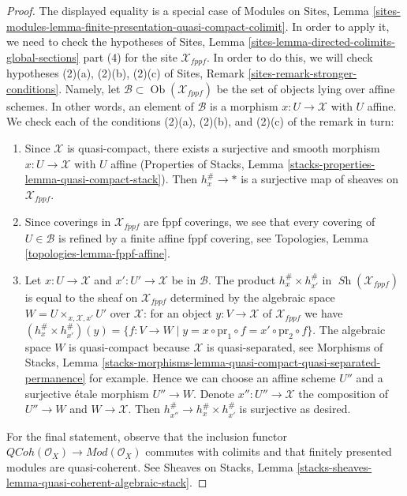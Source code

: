 \documentclass[10pt,a4paper]{amsart}
\theoremstyle{plain}
\theoremstyle{definition}
\theoremstyle{remark}
\numberwithin{equation}{subsection}
\def\Ob{\mathop{\mathrm{Ob}}\nolimits}
\def\Sh{\mathop{\mathit{Sh}}\nolimits}
\def\QCoh{\mathit{QCoh}}
\begin{document}
\begin{proof}
The displayed equality is a special case of Modules on Sites, Lemma
\ref{sites-modules-lemma-finite-presentation-quasi-compact-colimit}.
In order to apply it, we need to check the hypotheses of
Sites, Lemma \ref{sites-lemma-directed-colimits-global-sections} part (4)
for the site $\mathcal{X}_{fppf}$. In order to do this, we will check
hypotheses (2)(a), (2)(b), (2)(c) of
Sites, Remark \ref{sites-remark-stronger-conditions}.
Namely, let $\mathcal{B} \subset \Ob(\mathcal{X}_{fppf})$ be the set
of objects lying over affine schemes. In other words, an element
of $\mathcal{B}$ is a morphism $x : U \to \mathcal{X}$ with $U$ affine.
We check each of the conditions (2)(a), (2)(b), and (2)(c)
of the remark in turn:
\begin{enumerate}
\item Since $\mathcal{X}$ is quasi-compact, there exists a
surjective and smooth morphism $x : U \to \mathcal{X}$ with $U$ affine
(Properties of Stacks, Lemma
\ref{stacks-properties-lemma-quasi-compact-stack}).
Then $h_x^\# \to *$ is a surjective map of sheaves on $\mathcal{X}_{fppf}$.
\item Since coverings in $\mathcal{X}_{fppf}$ are fppf
coverings, we see that every covering of $U \in \mathcal{B}$ is refined
by a finite affine fppf covering, see
Topologies, Lemma \ref{topologies-lemma-fppf-affine}.
\item Let $x : U \to \mathcal{X}$ and $x' : U' \to \mathcal{X}$ be
in $\mathcal{B}$. The product $h_x^\# \times h_{x'}^\#$ in
$\Sh(\mathcal{X}_{fppf})$ is equal to the sheaf on $\mathcal{X}_{fppf}$
determined by the algebraic space $W = U \times_{x, \mathcal{X}, x'} U'$ over
$\mathcal{X}$: for an object $y : V \to \mathcal{X}$ of
$\mathcal{X}_{fppf}$ we have
$(h_x^\# \times h_{x'}^\#)(y) = \{f : V \to W \mid y =
x \circ \text{pr}_1 \circ f = x' \circ \text{pr}_2 \circ f\}$.
The algebraic space $W$ is quasi-compact because $\mathcal{X}$
is quasi-separated, see Morphisms of Stacks, Lemma
\ref{stacks-morphisms-lemma-quasi-compact-quasi-separated-permanence}
for example. Hence we can choose an affine scheme $U''$ and
a surjective \'etale morphism $U'' \to W$. Denote $x'' : U'' \to \mathcal{X}$
the composition of $U'' \to W$ and $W \to \mathcal{X}$. Then
$h_{x''}^\# \to h_x^\# \times h_{x'}^\#$ is surjective as desired.
\end{enumerate}
For the final statement, observe that the inclusion functor
$\QCoh(\mathcal{O}_X) \to \textit{Mod}(\mathcal{O}_X)$
commutes with colimits and that finitely presented modules
are quasi-coherent. See Sheaves on Stacks, Lemma
\ref{stacks-sheaves-lemma-quasi-coherent-algebraic-stack}.
\end{proof}
\end{document}

